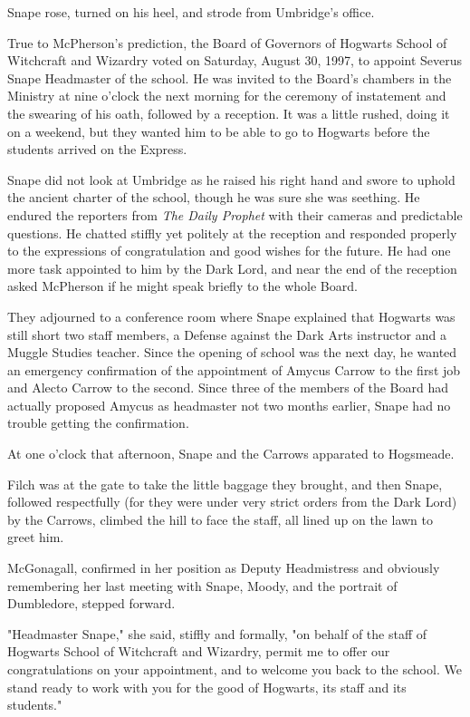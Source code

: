 Snape rose, turned on his heel, and strode from Umbridge's office.

True to McPherson's prediction, the Board of Governors of Hogwarts School of Witchcraft and Wizardry voted on Saturday, August 30, 1997, to appoint Severus Snape Headmaster of the school. He was invited to the Board's chambers in the Ministry at nine o'clock the next morning for the ceremony of instatement and the swearing of his oath, followed by a reception. It was a little rushed, doing it on a weekend, but they wanted him to be able to go to Hogwarts before the students arrived on the Express.

Snape did not look at Umbridge as he raised his right hand and swore to uphold the ancient charter of the school, though he was sure she was seething. He endured the reporters from \emph{The Daily Prophet} with their cameras and predictable questions. He chatted stiffly yet politely at the reception and responded properly to the expressions of congratulation and good wishes for the future. He had one more task appointed to him by the Dark Lord, and near the end of the reception asked McPherson if he might speak briefly to the whole Board.

They adjourned to a conference room where Snape explained that Hogwarts was still short two staff members, a Defense against the Dark Arts instructor and a Muggle Studies teacher. Since the opening of school was the next day, he wanted an emergency confirmation of the appointment of Amycus Carrow to the first job and Alecto Carrow to the second. Since three of the members of the Board had actually proposed Amycus as headmaster not two months earlier, Snape had no trouble getting the confirmation.

At one o'clock that afternoon, Snape and the Carrows apparated to Hogsmeade.

Filch was at the gate to take the little baggage they brought, and then Snape, followed respectfully (for they were under very strict orders from the Dark Lord) by the Carrows, climbed the hill to face the staff, all lined up on the lawn to greet him.

McGonagall, confirmed in her position as Deputy Headmistress and obviously remembering her last meeting with Snape, Moody, and the portrait of Dumbledore, stepped forward.

"Headmaster Snape," she said, stiffly and formally, "on behalf of the staff of Hogwarts School of Witchcraft and Wizardry, permit me to offer our congratulations on your appointment, and to welcome you back to the school. We stand ready to work with you for the good of Hogwarts, its staff and its students."

